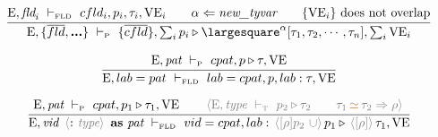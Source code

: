 \documentclass[11pt,a4paper]{article}
\newcommand{\key}[1]{\textrm{\textbf{#1}}}
\newcommand{\prodlhs}[1]{\textit{#1}}
\newcommand{\irecrd}[2]{\largesquare^{#1}{#2}}
\newcommand{\qualtype}[2]{#1 \triangleright #2}
\newcommand{\unify}[3]{#1\,{\color{brown}{\simeq}}\,#2 \Rightarrow #3}
\newcommand{\braced}[1]{\{#1\}}
\newcommand{\angled}[1]{\,{\color{gray}\langle#1\rangle}\,}
\newcommand{\Env}  {\textrm{E}}
\newcommand{\VE}   {\textrm{VE}}
\newcommand{\vdashP}  {\ \vdash_{\textrm{\tiny P}}\  }
\newcommand{\vdashT}  {\ \vdash_{\textrm{\tiny T}}\  }
\newcommand{\vdashFLD}{\ \vdash_\textrm{\tiny FLD}\  }
\newcommand{\corenew}[1]{\textit{new\_#1}}
\begin{document}
\[
\cfrac
 {\Env,\prodlhs{fld}_i \vdashFLD cfld_i,p_i,\tau_i,\VE_i \qquad
  \alpha \Leftarrow \corenew{tyvar}                      \qquad
  \braced{\VE_i}\ \textrm{does not overlap}}
 {\Env, \braced{\overline{fld},\key{...}} \vdashP
    \braced{\overline{cfld}}, \qualtype{\sum_i p_i}{\irecrd{\alpha}{[\tau_1,\tau_2,\cdots,\tau_n]}}, \sum_i\VE_i}
\]

\[
\cfrac
 {\Env,\prodlhs{pat} \vdashP cpat, \qualtype{p}{\tau}, \VE}
 {\Env, lab = pat \vdashFLD lab=cpat, p, lab:\tau, \VE }
\]

\[
\cfrac
 {\Env,\prodlhs{pat}  \vdashP cpat,\qualtype{p_1}{\tau_1}, \VE      \qquad
  \angled{\Env,\prodlhs{type} \vdashT \qualtype{p_2}{\tau_2}        \qquad
  \unify{\tau_1}{\tau_2}{\rho}}}
 {\Env, \prodlhs{vid}\ \angled{\key{:}\ \prodlhs{type}}\ \key{as}\ \prodlhs{pat}  \vdashFLD 
    vid=cpat, lab:\qualtype{\angled{[\rho]p_2\ \cup} p_1}{\angled{[\rho]}\tau_1}, \VE }
\]
\end{document}
